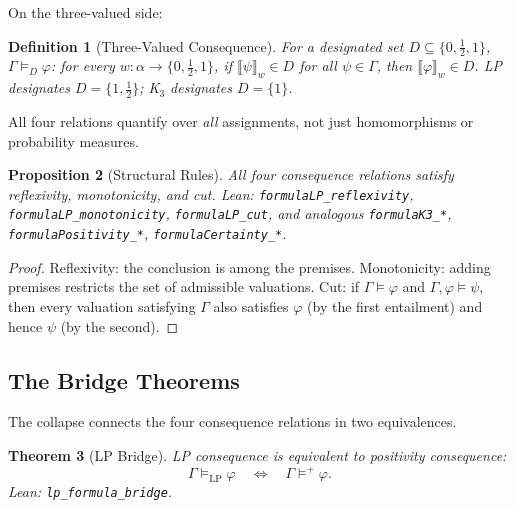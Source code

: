 \documentclass[11pt,a4paper]{article}
\newtheorem{theorem}{Theorem}[section]
\newtheorem{proposition}[theorem]{Proposition}
\newtheorem{definition}[theorem]{Definition}
\begin{document}
On the three-valued side:

\begin{definition}[Three-Valued Consequence]
\label{def:three-val-cons}
For a designated set $D \subseteq \{0, \tfrac{1}{2}, 1\}$,
$\Gamma \models_D \varphi$: for every $w : \alpha \to \{0,
\tfrac{1}{2}, 1\}$, if $\llbracket\psi\rrbracket_w \in D$ for all
$\psi \in \Gamma$, then $\llbracket\varphi\rrbracket_w \in D$.
LP designates $D = \{1, \tfrac{1}{2}\}$; K$_3$ designates
$D = \{1\}$.
\end{definition}

All four relations quantify over \emph{all} assignments, not just
homomorphisms or probability measures.

\begin{proposition}[Structural Rules]
\label{prop:structural}
All four consequence relations satisfy reflexivity, monotonicity, and
cut.
Lean: \texttt{formulaLP\_reflexivity},
\texttt{formulaLP\_monotonicity},
\texttt{formulaLP\_cut},
and analogous \texttt{formulaK3\_*},
\texttt{formulaPositivity\_*},
\texttt{formulaCertainty\_*}.
\end{proposition}

\begin{proof}
Reflexivity: the conclusion is among the premises.
Monotonicity: adding premises restricts the set of admissible
valuations.
Cut: if $\Gamma \models \varphi$ and $\Gamma, \varphi \models \psi$,
then every valuation satisfying $\Gamma$ also satisfies $\varphi$
(by the first entailment) and hence $\psi$ (by the second).
\end{proof}

\subsection{The Bridge Theorems}
\label{sec:bridge-thms}

The collapse connects the four consequence relations in two
equivalences.

\begin{theorem}[LP Bridge]
\label{thm:lp-bridge}
LP consequence is equivalent to positivity consequence:
\[
\Gamma \models_{\mathrm{LP}} \varphi
\quad \Longleftrightarrow \quad
\Gamma \models^+ \varphi.
\]
Lean: \texttt{lp\_formula\_bridge}.
\end{theorem}
\end{document}
